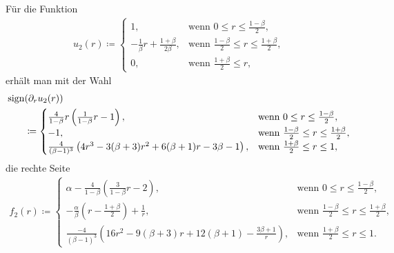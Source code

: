 Für die Funktion
\begin{align*}
  u_2(r)\coloneqq 
  \begin{cases}
    1, & \text{wenn } 0\leq r\leq\frac{1-\beta}{2},\\
    -\frac{1}{\beta}r + \frac{1+\beta}{2\beta}, & 
    \text{wenn } \frac{1-\beta}{2}\leq r\leq \frac{1+\beta}{2},\\
    0, & \text{wenn } \frac{1+\beta}{2}\leq r,
  \end{cases}
\end{align*}
erhält man mit der Wahl
\begin{align*}
  \operatorname{sign}&(\partial_r u_2(r)) \\
  &\coloneqq 
  \begin{cases}
    \frac{4}{1-\beta}r\left(\frac{1}{1-\beta}r -1\right), &
    \text{wenn } 0\leq r\leq\frac{1-\beta}{2},\\
    -1, & \text{wenn } \frac{1-\beta}{2}\leq r\leq \frac{1+\beta}{2},\\
    \frac{4}{(\beta-1)^3}
    \left( 4r^3-3(\beta+3)r^2 +6(\beta+1)r-3\beta-1\right), & 
    \text{wenn } \frac{1+\beta}{2}\leq r\leq 1,
  \end{cases}
\end{align*}
die rechte Seite
\begin{align*}
  f_2(r)\coloneqq 
  \begin{cases}
    \alpha - \frac{4}{1-\beta}\left(\frac{3}{1-\beta}r - 2\right), &
    \text{wenn } 0\leq r\leq\frac{1-\beta}{2},\\
    -\frac{\alpha}{\beta}\left( r-\frac{1+\beta}{2} \right) +\frac{1}{r}, & 
    \text{wenn } \frac{1-\beta}{2}\leq r\leq \frac{1+\beta}{2},\\
    \frac{-4}{(\beta-1)^3}
    \left( 16r^2 -9(\beta+3)r + 12(\beta+1) - \frac{3\beta+1}{r}\right), & 
    \text{wenn } \frac{1+\beta}{2}\leq r\leq 1.
  \end{cases}
\end{align*}

